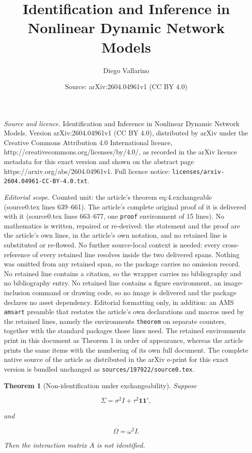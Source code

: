 \documentclass[10pt,a4paper]{amsart}
\title{Identification and Inference in Nonlinear Dynamic Network Models}
\author{Diego Vallarino}
\date{Source: arXiv:2604.04961v1 (CC BY 4.0)}
\newtheorem{theorem}{Theorem}
\begin{document}
\maketitle

\noindent\emph{Source and licence.} Identification and Inference in Nonlinear Dynamic Network Models. Version arXiv:2604.04961v1 (CC BY 4.0), distributed by arXiv under the Creative Commons Attribution 4.0 International licence, http://creativecommons.org/licenses/by/4.0/, as recorded in the arXiv licence metadata for this exact version and shown on the abstract page https://arxiv.org/abs/2604.04961v1. Full licence notice: \texttt{licenses/arxiv-2604.04961-CC-BY-4.0.txt}.\par\smallskip

\noindent\textit{Editorial scope.} Counted unit: the article's theorem eq:4.exchangeable (source0.tex lines 639--661). The article's complete original proof of it is delivered with it (source0.tex lines 663--677, one \texttt{proof} environment of 15 lines). No mathematics is written, repaired or re-derived: the statement and the proof are the article's own lines, in the article's own notation, and no retained line is substituted or re-flowed.  No further source-local context is needed: every cross-reference of every retained line resolves inside the two delivered spans.  Nothing was omitted from any retained span, so the package carries no omission record.  No retained line contains a citation, so the wrapper carries no bibliography and no bibliography entry.  No retained line contains a figure environment, an image-inclusion command or drawing code, so no image is delivered and the package declares no asset dependency.  Editorial formatting only, in addition: an AMS \texttt{amsart} preamble that restates the article's own declarations and macros used by the retained lines, namely the environments \texttt{theorem} on separate counters, together with the standard packages those lines need.  The retained environments print in this document as Theorem 1 in order of appearance, whereas the article prints the same items with the numbering of its own full document.  The complete native source of the article as distributed in the arXiv e-print for this exact version is bundled unchanged as \texttt{sources/197922/source0.tex}.
\begin{theorem}[Non-identification under exchangeability]
Suppose

\begin{equation}
\Sigma
=
\sigma^2 I
+
\tau^2 \mathbf{1}\mathbf{1}',
\label{eq:4.exchangeable}
\end{equation}

and

\begin{equation}
\Omega
=
\omega^2 I.
\label{eq:4.exchangeable2}
\end{equation}

Then the interaction matrix $A$ is not identified.
\end{theorem}
\end{document}
